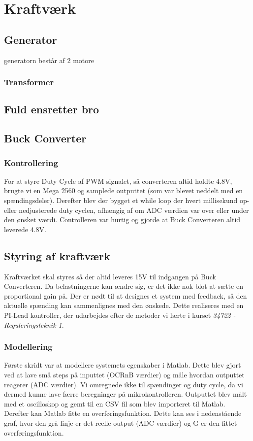 \documentclass[../main.tex]{subfiles}
\begin{document}
\chapter{Kraftværk} \label{Chap:Kraftværk}

\section{Generator}
generatorn består af 2 motore  
\subsection{Transformer}
\section{Fuld ensretter bro}
\section{Buck Converter}
\subsection{Kontrollering}
For at styre Duty Cycle af PWM signalet, så converteren altid holdte 4.8V, brugte vi en Mega 2560 og samplede outputtet (som var blevet neddelt med en spændingsdeler). Derefter blev der bygget et while loop der hvert millisekund op- eller nedjusterede duty cyclen, afhængig af om ADC værdien var over eller under den ønsket værdi. Controlleren var hurtig og gjorde at Buck Converteren altid leverede 4.8V. 

\section{Styring af kraftværk}
Kraftværket skal styres så der altid leveres 15V til indgangen på Buck Converteren. Da belastningerne kan ændre sig, er det ikke nok blot at sætte en proportional gain på. Der er nødt til at designes et system med feedback, så den aktuelle spænding kan sammenlignes med den ønskede. Dette realiseres med en PI-Lead kontroller, der udarbejdes efter de metoder vi lærte i kurset \emph{34722 - Reguleringsteknik 1}.

\subsection{Modellering}
Første skridt var at modellere systemets egenskaber i Matlab. Dette blev gjort ved at lave små steps på inputtet (OCRnB værdier) og måle hvordan outputtet reagerer (ADC værdier). Vi omregnede ikke til spændinger og duty cycle, da vi dermed kunne lave færre beregninger på mikrokontrolleren. Outputtet blev målt med et oscilloskop og gemt til en CSV fil som blev importeret til Matlab. Derefter kan Matlab fitte en overføringsfunktion. Dette kan ses i nedenstående graf, hvor den grå linje er det reelle output (ADC værdier) og G er den fittet overføringsfunktion. 
\end{document}
